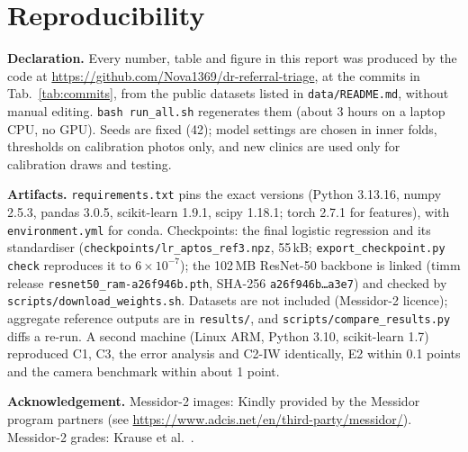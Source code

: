 \documentclass[10pt,twocolumn,letterpaper]{article}
\begin{document}
\section{Reproducibility}
\textbf{Declaration.} Every number, table and figure in this report was produced by the code at \url{https://github.com/Nova1369/dr-referral-triage}, at the commits in Tab.~\ref{tab:commits}, from the public datasets listed in \texttt{data/README.md}, without manual editing. \texttt{bash run\_all.sh} regenerates them (about 3 hours on a laptop CPU, no GPU). Seeds are fixed (42); model settings are chosen in inner folds, thresholds on calibration photos only, and new clinics are used only for calibration draws and testing.

\textbf{Artifacts.} \texttt{requirements.txt} pins the exact versions (Python 3.13.16, numpy 2.5.3, pandas 3.0.5, scikit-learn 1.9.1, scipy 1.18.1; torch 2.7.1 for features), with \texttt{environment.yml} for conda. Checkpoints: the final logistic regression and its standardiser (\texttt{checkpoints/lr\_aptos\_ref3.npz}, 55\,kB; \texttt{export\_checkpoint.py check} reproduces it to $6\times10^{-7}$); the 102\,MB ResNet-50 backbone is linked (timm release \texttt{resnet50\_ram-a26f946b.pth}, SHA-256 \texttt{a26f946b\dots a3e7}) and checked by \texttt{scripts/download\_weights.sh}. Datasets are not included (Messidor-2 licence); aggregate reference outputs are in \texttt{results/}, and \texttt{scripts/compare\_results.py} diffs a re-run. A second machine (Linux ARM, Python 3.10, scikit-learn 1.7) reproduced C1, C3, the error analysis and C2-IW identically, E2 within 0.1 points and the camera benchmark within about 1 point.



\textbf{Acknowledgement.} Messidor-2 images: Kindly provided by the Messidor program partners (see \url{https://www.adcis.net/en/third-party/messidor/}). Messidor-2 grades: Krause et al.~\cite{krause}.
\end{document}

